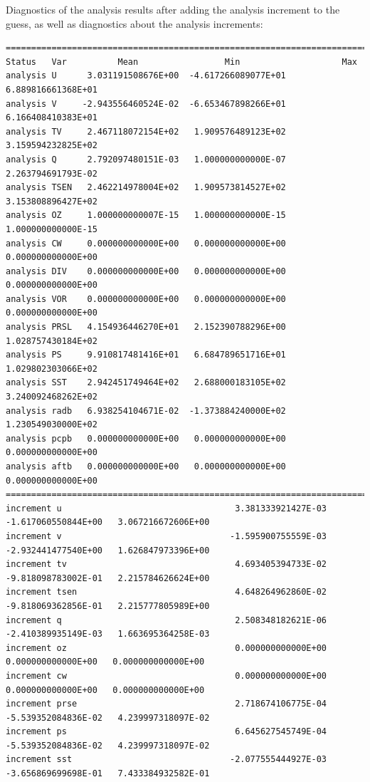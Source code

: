 Diagnostics of the analysis results after adding the analysis increment to the guess, as well as diagnostics about the analysis increments: 
\begin{scriptsize}
\begin{verbatim}
================================================================================
Status   Var          Mean                 Min                    Max
analysis U      3.031191508676E+00  -4.617266089077E+01   6.889816661368E+01
analysis V     -2.943556460524E-02  -6.653467898266E+01   6.166408410383E+01
analysis TV     2.467118072154E+02   1.909576489123E+02   3.159594232825E+02
analysis Q      2.792097480151E-03   1.000000000000E-07   2.263794691793E-02
analysis TSEN   2.462214978004E+02   1.909573814527E+02   3.153808896427E+02
analysis OZ     1.000000000007E-15   1.000000000000E-15   1.000000000000E-15
analysis CW     0.000000000000E+00   0.000000000000E+00   0.000000000000E+00
analysis DIV    0.000000000000E+00   0.000000000000E+00   0.000000000000E+00
analysis VOR    0.000000000000E+00   0.000000000000E+00   0.000000000000E+00
analysis PRSL   4.154936446270E+01   2.152390788296E+00   1.028757430184E+02
analysis PS     9.910817481416E+01   6.684789651716E+01   1.029802303066E+02
analysis SST    2.942451749464E+02   2.688000183105E+02   3.240092468262E+02
analysis radb   6.938254104671E-02  -1.373884240000E+02   1.230549030000E+02
analysis pcpb   0.000000000000E+00   0.000000000000E+00   0.000000000000E+00
analysis aftb   0.000000000000E+00   0.000000000000E+00   0.000000000000E+00
================================================================================
increment u                                  3.381333921427E-03  -1.617060550844E+00   3.067216672606E+00
increment v                                 -1.595900755559E-03  -2.932441477540E+00   1.626847973396E+00
increment tv                                 4.693405394733E-02  -9.818098783002E-01   2.215784626624E+00
increment tsen                               4.648264962860E-02  -9.818069362856E-01   2.215777805989E+00
increment q                                  2.508348182621E-06  -2.410389935149E-03   1.663695364258E-03
increment oz                                 0.000000000000E+00   0.000000000000E+00   0.000000000000E+00
increment cw                                 0.000000000000E+00   0.000000000000E+00   0.000000000000E+00
increment prse                               2.718674106775E-04  -5.539352084836E-02   4.239997318097E-02
increment ps                                 6.645627545749E-04  -5.539352084836E-02   4.239997318097E-02
increment sst                               -2.077555444927E-03  -3.656869699698E-01   7.433384932582E-01 
\end{verbatim}
\end{scriptsize}

